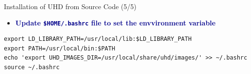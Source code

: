\begin{frame}[fragile]{Installation of UHD from Source Code (5/5)}
\vspace{-3.0cm}
\footnotesize

\begin{itemize}
    \item \textbf{\textcolor{DarkBlue}{Update \texttt{\$HOME/.bashrc} file to set the envvironment variable}}
\end{itemize}

\footnotesize
\begin{Verbatim}[xleftmargin=3.8em,breaklines,breaksymbolleft={},breaksymbolright={}]
export LD_LIBRARY_PATH=/usr/local/lib:$LD_LIBRARY_PATH
export PATH=/usr/local/bin:$PATH
echo 'export UHD_IMAGES_DIR=/usr/local/share/uhd/images/' >> ~/.bashrc
source ~/.bashrc
\end{Verbatim}

\end{frame}